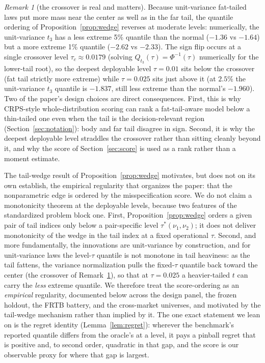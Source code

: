 \documentclass[11pt]{article}
\theoremstyle{remark}
\newtheorem{remark}{Remark}
\begin{document}
\begin{remark}[the crossover is real and matters]\label{rem:crossover}
Because unit-variance fat-tailed laws put more mass near the
center as well as in the far tail, the quantile ordering of
Proposition~\ref{prop:wedge} reverses at moderate levels: numerically,
the unit-variance $t_3$ has a less extreme 5\% quantile than the
normal ($-1.36$ vs $-1.64$) but a more extreme 1\% quantile ($-2.62$ vs
$-2.33$). The sign flip occurs at a single crossover level
$\tau_c \approx 0.0179$ (solving $Q_{t_3}(\tau)=\Phi^{-1}(\tau)$
numerically for the lower-tail root), so the deepest deployable level
$\tau = 0.01$ sits below the crossover (fat tail strictly more
extreme) while $\tau = 0.025$ sits just above it (at $2.5\%$ the
unit-variance $t_3$ quantile is $-1.837$, still less extreme than the
normal's $-1.960$). Two of the paper's design choices are direct
consequences. First, this is why CRPS-style whole-distribution
scoring can rank a fat-tail-aware model below a thin-tailed one
even when the tail is the decision-relevant region
(Section~\ref{sec:notation}): body and far tail disagree in sign.
Second, it is why the deepest deployable level straddles the crossover
rather than sitting cleanly beyond it, and why the score of
Section~\ref{sec:score} is used as a rank rather than a moment
estimate.
\end{remark}

\medskip\noindent The tail-wedge result of Proposition~\ref{prop:wedge}
motivates, but does not on its own establish, the empirical regularity
that organizes the paper: that the nonparametric edge is ordered by the
misspecification score. We do not claim a monotonicity theorem at the
deployable levels, because two features of the standardized problem
block one. First, Proposition~\ref{prop:wedge} orders a given pair of
tail indices only below a pair-specific level $\tau^*(\nu_1,\nu_2)$; it
does not deliver monotonicity of the wedge in the tail index at a fixed
operational $\tau$. Second, and more fundamentally, the innovations are
unit-variance by construction, and for unit-variance laws the level-$\tau$
quantile is not monotone in tail heaviness: as the tail fattens, the
variance normalization pulls the fixed-$\tau$ quantile back toward the
center (the crossover of Remark~\ref{rem:crossover}), so that at
$\tau=0.025$ a heavier-tailed $t$ can carry the \emph{less} extreme
quantile. We therefore treat the score-ordering as an \emph{empirical}
regularity, documented below across the design panel, the frozen
holdout, the FRTB battery, and the cross-market universes, and motivated
by the tail-wedge mechanism rather than implied by it. The one exact
statement we lean on is the regret identity (Lemma~\ref{lem:regret}):
wherever the benchmark's reported quantile differs from the oracle's at a
level, it pays a pinball regret that is positive and, to second order,
quadratic in that gap, and the score is our observable proxy for where
that gap is largest.
\end{document}
